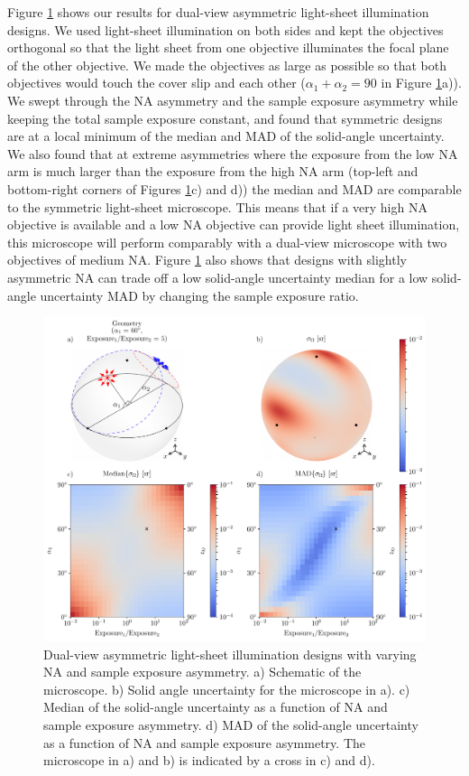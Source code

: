 \documentclass[10pt]{article}
\begin{document}
Figure \ref{fig:asymmetric-double} shows our results for dual-view asymmetric
light-sheet illumination designs. We used light-sheet illumination on both sides
and kept the objectives orthogonal so that the light sheet from one objective
illuminates the focal plane of the other objective. We made the objectives
as large as possible so that both objectives would touch the cover slip and each
other ($\alpha_1 + \alpha_2 = 90$ in Figure \ref{fig:asymmetric-double}a)). We
swept through the NA asymmetry and the sample exposure asymmetry while keeping
the total sample exposure constant, and found that symmetric designs are at a
local minimum of the median and MAD of the solid-angle uncertainty. We also
found that at extreme asymmetries where the exposure from the low NA arm is much
larger than the exposure from the high NA arm (top-left and bottom-right corners
of Figures \ref{fig:asymmetric-double}c) and d)) the median and MAD are
comparable to the symmetric light-sheet microscope. This means that if a very
high NA objective is available and a low NA objective can provide light sheet
illumination, this microscope will perform comparably with a dual-view
microscope with two objectives of medium NA. Figure \ref{fig:asymmetric-double}
also shows that designs with slightly asymmetric NA can trade off a low
solid-angle uncertainty median for a low solid-angle uncertainty MAD by changing
the sample exposure ratio.

\begin{figure}[htbp]
  \centering\includegraphics[width=\textwidth]{asymmetric-double}
  \caption{Dual-view asymmetric light-sheet illumination designs with varying NA and
    sample exposure asymmetry. a) Schematic of the microscope. b) Solid angle
    uncertainty for the microscope in a). c) Median of the solid-angle
    uncertainty as a function of NA and sample exposure asymmetry. d) MAD of the
    solid-angle uncertainty as a function of NA and sample exposure
    asymmetry. The microscope in a) and b) is indicated by a cross in c) and
    d).}
\label{fig:asymmetric-double}
\end{figure}
\end{document}
